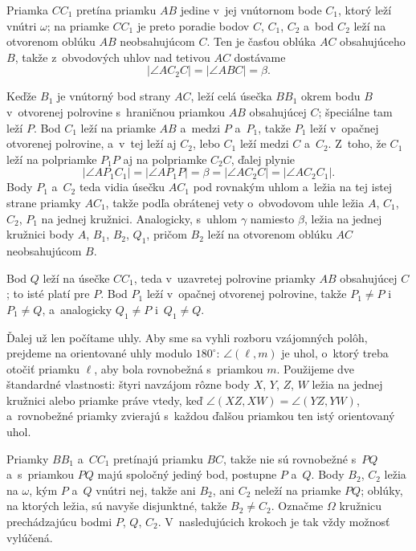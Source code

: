 {    Priamka $CC_1$ pretína priamku $AB$ jedine v~jej vnútornom bode $C_1$, ktorý leží vnútri $\omega$; na priamke $CC_1$ je preto poradie bodov $C$, $C_1$, $C_2$ a~bod $C_2$ leží na otvorenom oblúku $AB$ neobsahujúcom $C$. Ten je časťou oblúka $AC$ obsahujúceho $B$, takže z~obvodových uhlov nad tetivou $AC$ dostávame
    $$
    |\angle AC_2C| = |\angle ABC| = \beta.
    $$

    Keďže $B_1$ je vnútorný bod strany $AC$, leží celá úsečka $BB_1$ okrem bodu $B$ v~otvorenej polrovine s~hraničnou priamkou $AB$ obsahujúcej $C$; špeciálne tam leží $P$. Bod $C_1$ leží na priamke $AB$ a~medzi $P$ a~$P_1$, takže $P_1$ leží v~opačnej otvorenej polrovine, a~v~tej leží aj $C_2$, lebo $C_1$ leží medzi $C$ a~$C_2$. Z~toho, že $C_1$ leží na polpriamke $P_1P$ aj na polpriamke $C_2C$, ďalej plynie
    $$
    |\angle AP_1C_1| = |\angle AP_1P| = \beta = |\angle AC_2C| = |\angle AC_2C_1|.
    $$
    Body $P_1$ a~$C_2$ teda vidia úsečku $AC_1$ pod rovnakým uhlom a~ležia na tej istej strane priamky $AC_1$, takže podľa obrátenej vety o~obvodovom uhle ležia $A$, $C_1$, $C_2$, $P_1$ na jednej kružnici. Analogicky, s~uhlom $\gamma$ namiesto $\beta$, ležia na jednej kružnici body $A$, $B_1$, $B_2$, $Q_1$, pričom $B_2$ leží na otvorenom oblúku $AC$ neobsahujúcom $B$.

    Bod $Q$ leží na úsečke $CC_1$, teda v~uzavretej polrovine priamky $AB$ obsahujúcej $C$; to isté platí pre $P$. Bod $P_1$ leží v~opačnej otvorenej polrovine, takže $P_1 \neq P$ i~$P_1 \neq Q$, a~analogicky $Q_1 \neq P$ i~$Q_1 \neq Q$.

    Ďalej už len počítame uhly. Aby sme sa vyhli rozboru vzájomných polôh, prejdeme na orientované uhly modulo $180^\circ$: $\angle(\ell,m)$ je uhol, o~ktorý treba otočiť priamku $\ell$, aby bola rovnobežná s~priamkou $m$. Použijeme dve štandardné vlastnosti: štyri navzájom rôzne body $X$, $Y$, $Z$, $W$ ležia na jednej kružnici alebo priamke práve vtedy, keď $\angle(XZ,XW) = \angle(YZ,YW)$, a~rovnobežné priamky zvierajú s~každou ďalšou priamkou ten istý orientovaný uhol.

    Priamky $BB_1$ a~$CC_1$ pretínajú priamku $BC$, takže nie sú rovnobežné s~$PQ$ a~s~priamkou $PQ$ majú spoločný jediný bod, postupne $P$ a~$Q$. Body $B_2$, $C_2$ ležia na $\omega$, kým $P$ a~$Q$ vnútri nej, takže ani $B_2$, ani $C_2$ neleží na priamke $PQ$; oblúky, na ktorých ležia, sú navyše disjunktné, takže $B_2 \neq C_2$. Označme $\Omega$ kružnicu prechádzajúcu bodmi $P$, $Q$, $C_2$. V~nasledujúcich krokoch je tak vždy možnosť  vylúčená.

}
